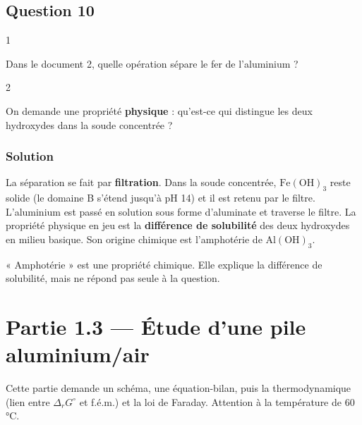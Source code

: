 \documentclass[11pt,a4paper]{article}
\begin{document}
\hypertarget{question-10}{%
\subsection{Question 10}\label{question-10}}

\begin{indication}{1}

Dans le document 2, quelle opération sépare le fer de l'aluminium ?

\end{indication}

\begin{indication}{2}

On demande une propriété \textbf{physique} : qu'est-ce qui distingue les deux hydroxydes dans la soude concentrée ?

\end{indication}

\hypertarget{solution-9}{%
\subsubsection{Solution}\label{solution-9}}

La séparation se fait par \textbf{filtration}. Dans la soude concentrée, \(\mathrm{Fe(OH)_3}\) reste solide (le domaine B s'étend jusqu'à pH 14) et il est retenu par le filtre. L'aluminium est passé en solution sous forme d'aluminate et traverse le filtre. La propriété physique en jeu est la \textbf{différence de solubilité} des deux hydroxydes en milieu basique. Son origine chimique est l'amphotérie de \(\mathrm{Al(OH)_3}\).

\begin{piege}

« Amphotérie » est une propriété chimique. Elle explique la différence de solubilité, mais ne répond pas seule à la question.

\end{piege}

\hypertarget{partie-1.3-uxe9tude-dune-pile-aluminiumair}{%
\section{Partie 1.3 --- Étude d'une pile aluminium/air}\label{partie-1.3-uxe9tude-dune-pile-aluminiumair}}

Cette partie demande un schéma, une équation-bilan, puis la thermodynamique (lien entre \(\Delta_rG^\circ\) et f.é.m.) et la loi de Faraday. Attention à la température de 60 °C.
\end{document}
